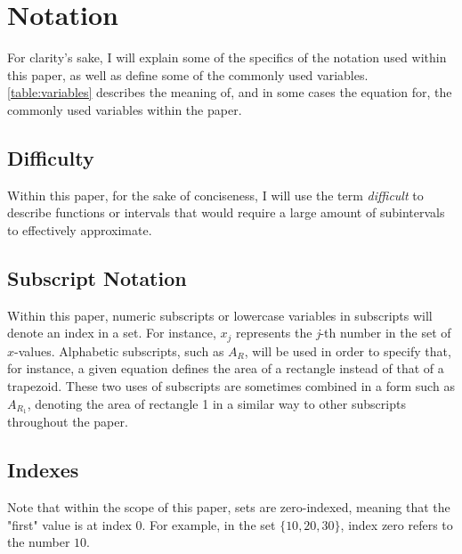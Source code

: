 \documentclass{paper}
\begin{document}
\section{Notation}
\label{sec:notation}
For clarity's sake, I will explain some of the specifics of the notation used within this paper, as well as define some of the commonly used variables.
\cref{table:variables} describes the meaning of, and in some cases the equation for, the commonly used variables within the paper.

\subsection{Difficulty}
Within this paper, for the sake of conciseness, I will use the term \emph{difficult} to describe functions or intervals that would require a large amount of subintervals to effectively approximate.

\subsection{Subscript Notation}
Within this paper, numeric subscripts or lowercase variables in subscripts will denote an index in a set.
For instance, \(x_j\) represents the \emph{j}-th number in the set of \(x\)-values.
Alphabetic subscripts, such as \(A_R\), will be used in order to specify that, for instance, a given equation defines the area of a rectangle instead of that of a trapezoid.
These two uses of subscripts are sometimes combined in a form such as \(A_{R_1}\), denoting the area of rectangle 1 in a similar way to other subscripts throughout the paper.

\subsection{Indexes}
Note that within the scope of this paper, sets are zero-indexed, meaning that the "first" value is at index \(0\).
For example, in the set \(\{10, 20, 30\}\), index zero refers to the number \(10\).
\end{document}
